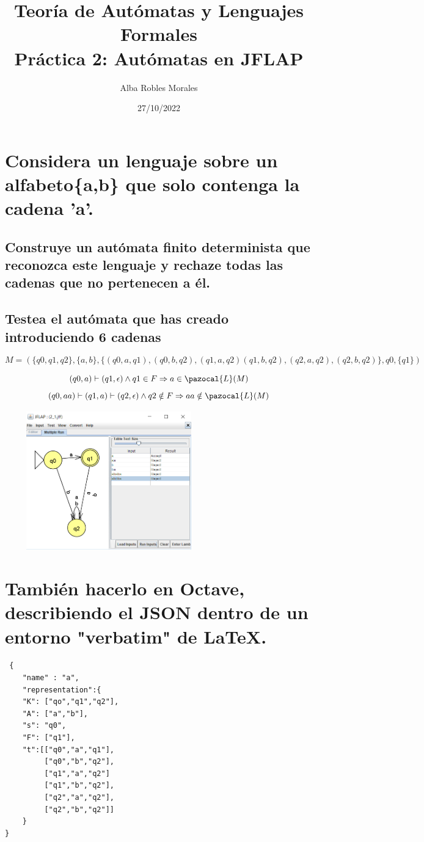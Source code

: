 \documentclass[fleqn, 10pt]{article}
\title{Teoría de Autómatas y Lenguajes Formales\\[.4\baselineskip]Práctica 2: Autómatas en JFLAP}
\author{Alba Robles Morales}
\date{27/10/2022}
\theoremstyle{plain}
\theoremstyle{definition}
\begin{document}
\maketitle

\section{Considera un lenguaje sobre un alfabeto\{a,b\} que solo contenga la cadena  'a'. }

\subsection{Construye un autómata finito determinista que reconozca este lenguaje y rechaze todas las cadenas que no pertenecen a él.}
\subsection{ Testea el autómata que has creado introduciendo 6 cadenas}

\begin{equation}
 M= (\{q0,q1,q2\},\{a,b\},\{(q0,a,q1),(q0,b,q2),(q1,a,q2)(q1,b,q2),(q2,a,q2),(q2,b,q2)\},q0, \{q1\}) 
\end{equation}

\begin{equation}
(q0,a)\vdash(q1, \epsilon)\wedge q1 \in F \Rightarrow a \in \pazocal{L}(M)
\end{equation}
\begin{equation}
(q0,aa)\vdash(q1, a)\vdash(q2, \epsilon)\wedge q2 \notin F \Rightarrow aa \notin \pazocal{L}(M)
\end{equation}

 
\begin{center}
\includegraphics[width=9cm, height=6cm]{2_1.png}
\end{center}

\section{También hacerlo en Octave, describiendo el JSON dentro de un entorno "verbatim" de \LaTeX.}
\begin{verbatim}
 {
	"name" : "a",
	"representation":{
	"K": ["qo","q1","q2"],
	"A": ["a","b"],
	"s": "q0",
	"F": ["q1"],
	"t":[["q0","a","q1"],
	     ["q0","b","q2"],
	     ["q1","a","q2"]
	     ["q1","b","q2"],
	     ["q2","a","q2"],
	     ["q2","b","q2"]]
	}
}
\end{verbatim}
\end{document}
